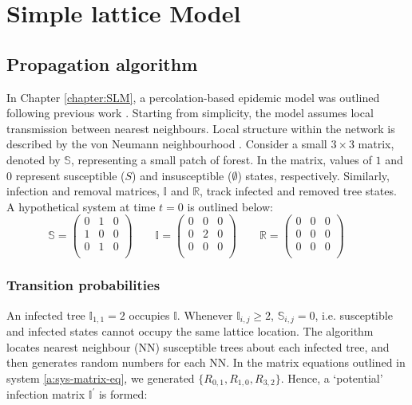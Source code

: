 \appendix
\chapter{Simple lattice Model}

\section{Propagation algorithm}
\label{a:propagation}
In Chapter \ref{chapter:SLM}, a percolation-based epidemic model was outlined following previous work \cite{OROZCOFUENTES201912}.
Starting from simplicity, the model assumes local transmission between nearest neighbours.
Local structure within the network is described by the von Neumann neighbourhood \cite{toffoli1987cellular}. 
Consider a small $3 \times 3$ matrix, denoted by $\mathbb{S}$, representing a small patch of forest.
In the matrix, values of $1$ and $0$ represent susceptible ($S$) and insusceptible ($\emptyset$) states, respectively.
Similarly, infection and removal matrices, $\mathbb{I}$ and $\mathbb{R}$, track infected and removed tree states.
A hypothetical system at time $t=0$ is outlined below:
\begin{equation}
\mathbb{S}= \left( \begin{array}{ccc}
0 & 1 & 0\\
1 & 0 & 0\\
0& 1 & 0 \\
\end{array} \right)\qquad
\mathbb{I}= \left( \begin{array}{ccc}
0 & 0 & 0\\
0 &2 & 0\\
0& 0 & 0 \\
\end{array} \right)\qquad
\mathbb{R} = \left( \begin{array}{ccc}
0 & 0 & 0\\
0 & 0 & 0\\
0 & 0 & 0 \\
\end{array} \right)\qquad
\label{a:sys-matrix-eq}
\end{equation}

\subsection{Transition probabilities}
\label{a:probablity-transition}

An infected tree $\mathbb{I}_{1,1} = 2$ occupies $\mathbb{I}$. 
Whenever $\mathbb{I}_{i,j} \ge 2$, $\mathbb{S}_{i,j} = 0$, i.e. susceptible and infected states cannot occupy the same lattice location.
The algorithm locates nearest neighbour (NN) susceptible trees about each infected tree, and then generates random numbers for each NN. 
In the matrix equations outlined in system \ref{a:sys-matrix-eq}, we generated $\{ R_{0,1},R_{1,0},R_{3,2}\}$. 
Hence, a `potential' infection matrix $\mathbb{I}^{'}$ is formed:


